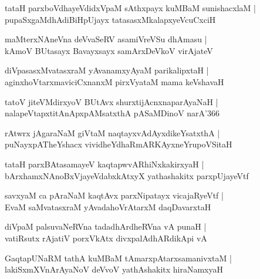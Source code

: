 \documentclass[twoside,12pt,openright]{book}
\newcounter{shloka}[chapter]
\begin{document}
\begin{shloka}%
tataH parxboVdhayeVdidxVpaM sAthxpayx kuMBaM sunishacxlaM |\\
pupaSxgaMdhAdiBiHpUjayx tatasasxMkalapxyeVcuCxciH
\end{shloka}

\begin{shloka}%
maMterxNAneVna deVvaSeRV asamiVreVSu dhAmasu |\\
kAmoV BUtasayx Bavayxsayx samArxDeVkoV virAjateV
\end{shloka}

\begin{shloka}%
diVpasasxMvatasxraM yAvanamxyAyaM parikalipxtaH |\\
aginxhoVtarxmaviciCxnanxM pirxVyataM mama keVshavaH 
\end{shloka}

\begin{shloka}%
tatoV jiteVMdirxyoV BUtAvx shurxtijAcnxnaparAyaNaH |\\
nalapeVtapxtitAnApxpAMsatxthA pASaMDinoV narA\char'366
\end{shloka}

\begin{shloka}%
rAtwrx jAgaraNaM giVtaM naqtayxvAdAyxdikeYsatxthA |\\
puNayxpATheYshacx vividheYdhaRmARKAyxneYrupoVSitaH
\end{shloka}

\begin{shloka}%
tataH parxBAtasamayeV kaqtapwvARhiNxkakirxyaH |\\
bArxhamxNAnoBxVjayeVdabxkAtxyX yathashakitx parxpUjayeVtf
\end{shloka}

\begin{shloka}%
savxyaM ca pAraNaM kaqtAvx parxNipatayx vicajaRyeVtf |\\
EvaM saMvatasxraM yAvadahoVrAtarxM daqDavarxtaH 
\end{shloka}

\begin{shloka}%
diVpaM palsuvaNeRVna tadadhArdheRVna vA punaH |\\
vatiRsutx rAjatiV porxVkAtx divxpalAdhARdikApi vA
\end{shloka}

\begin{shloka}%
GaqtapUNaRM tathA kuMBaM tAmarxpAtarxsamanivxtaM |\\
lakiSxmXVnArAyaNoV deVvoV yathAshakitx hiraNamxyaH 
\end{shloka}
\end{document}
